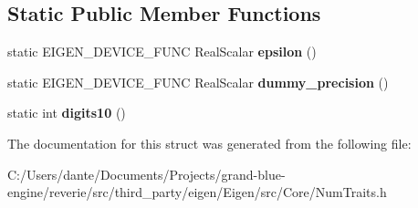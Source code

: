 \subsection*{Static Public Member Functions}
\begin{DoxyCompactItemize}
\item 
\mbox{\label{struct_eigen_1_1_num_traits_3_01_array_3_01_scalar_00_01_rows_00_01_cols_00_01_options_00_01_max_rows_00_01_max_cols_01_4_01_4_a9039536169068ac142ace493fa1c5527}} 
static E\+I\+G\+E\+N\+\_\+\+D\+E\+V\+I\+C\+E\+\_\+\+F\+U\+NC Real\+Scalar {\bfseries epsilon} ()
\item 
\mbox{\label{struct_eigen_1_1_num_traits_3_01_array_3_01_scalar_00_01_rows_00_01_cols_00_01_options_00_01_max_rows_00_01_max_cols_01_4_01_4_aa9c1591071935c1eb322c36c57da7e60}} 
static E\+I\+G\+E\+N\+\_\+\+D\+E\+V\+I\+C\+E\+\_\+\+F\+U\+NC Real\+Scalar {\bfseries dummy\+\_\+precision} ()
\item 
\mbox{\label{struct_eigen_1_1_num_traits_3_01_array_3_01_scalar_00_01_rows_00_01_cols_00_01_options_00_01_max_rows_00_01_max_cols_01_4_01_4_afa3c14d7e0a60c9aeea2328f09059239}} 
static int {\bfseries digits10} ()
\end{DoxyCompactItemize}


The documentation for this struct was generated from the following file\+:\begin{DoxyCompactItemize}
\item 
C\+:/\+Users/dante/\+Documents/\+Projects/grand-\/blue-\/engine/reverie/src/third\+\_\+party/eigen/\+Eigen/src/\+Core/Num\+Traits.\+h\end{DoxyCompactItemize}
